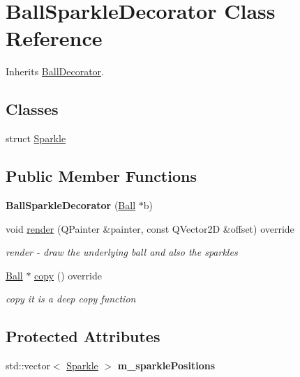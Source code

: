\hypertarget{class_ball_sparkle_decorator}{}\section{Ball\+Sparkle\+Decorator Class Reference}
\label{class_ball_sparkle_decorator}


Inherits \mbox{\hyperlink{class_ball_decorator}{Ball\+Decorator}}.

\subsection*{Classes}
\begin{DoxyCompactItemize}
\item 
struct \mbox{\hyperlink{struct_ball_sparkle_decorator_1_1_sparkle}{Sparkle}}
\end{DoxyCompactItemize}
\subsection*{Public Member Functions}
\begin{DoxyCompactItemize}
\item 
\mbox{\label{class_ball_sparkle_decorator_aebdaa2c5204a050a297c9255d885d0c3}} 
{\bfseries Ball\+Sparkle\+Decorator} (\mbox{\hyperlink{class_ball}{Ball}} $\ast$b)
\item 
void \mbox{\hyperlink{class_ball_sparkle_decorator_ad3ee562f1cc9dfa5835bca2fab3d30a7}{render}} (Q\+Painter \&painter, const Q\+Vector2D \&offset) override
\begin{DoxyCompactList}\small\item\em render -\/ draw the underlying ball and also the sparkles \end{DoxyCompactList}\item 
\mbox{\hyperlink{class_ball}{Ball}} $\ast$ \mbox{\hyperlink{class_ball_sparkle_decorator_a1fd1b10d028cc51c958eb5c9a7cf732c}{copy}} () override
\begin{DoxyCompactList}\small\item\em copy it is a deep copy function \end{DoxyCompactList}\end{DoxyCompactItemize}
\subsection*{Protected Attributes}
\begin{DoxyCompactItemize}
\item 
\mbox{\label{class_ball_sparkle_decorator_a225c9a37159214fbb658148713227fcf}} 
std\+::vector$<$ \mbox{\hyperlink{struct_ball_sparkle_decorator_1_1_sparkle}{Sparkle}} $>$ {\bfseries m\+\_\+sparkle\+Positions}
\end{DoxyCompactItemize}

